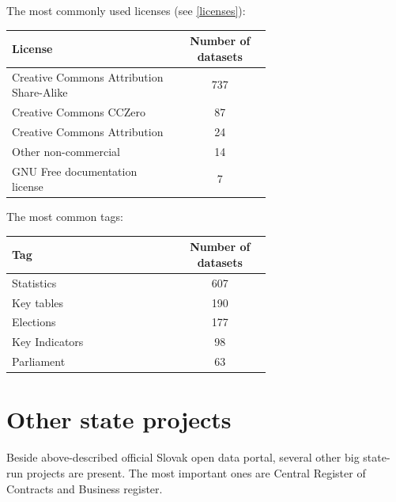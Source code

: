 \documentclass[thesis=B,english]{FITthesis}[2012/06/26]
\begin{document}
    \vspace{20px}
    The most commonly used licenses (see \ref{licenses}):
    \begin{center}
        \begin{tabular}{  p{0.65\linewidth} | c }
        \textbf{License} & \textbf{Number of datasets} \\ \hline
        Creative Commons Attribution Share-Alike & 737 \\
        Creative Commons CCZero & 87 \\
        Creative Commons Attribution & 24 \\
        Other non-commercial & 14 \\
        GNU Free documentation license & 7 \\
        \end{tabular}
    \end{center}
    \vspace{20px}
    The most common tags:
    \begin{center}
        \begin{tabular}{  p{0.65\linewidth} | c }
        \textbf{Tag} & \textbf{Number of datasets} \\ \hline
        Statistics & 607 \\
        Key tables & 190 \\
        Elections & 177 \\
        Key Indicators & 98 \\
        Parliament & 63 \\
        \end{tabular}
    \end{center}
    \section{Other state projects}
    Beside above-described official Slovak open data portal, several other big state-run projects are present. The most important ones are Central Register of Contracts and Business register.
\end{document}
